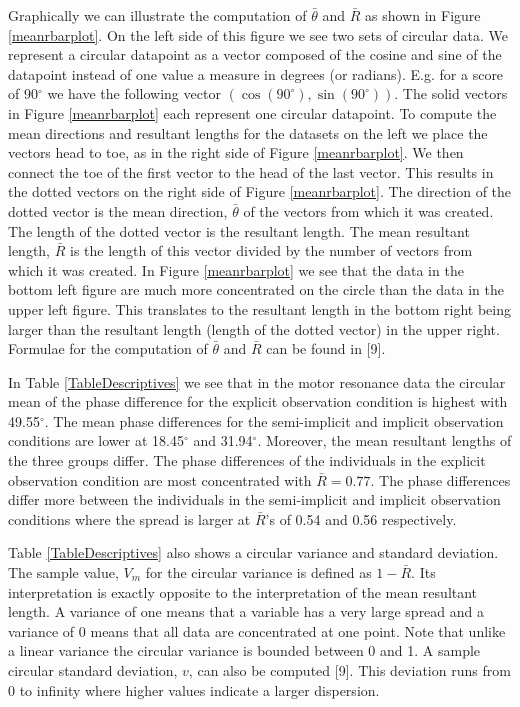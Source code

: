 \documentclass[11pt,]{article}
\begin{document}
Graphically we can illustrate the computation of \(\bar{\theta}\) and
\(\bar{R}\) as shown in Figure \ref{meanrbarplot}. On the left side of
this figure we see two sets of circular data. We represent a circular
datapoint as a vector composed of the cosine and sine of the datapoint
instead of one value a measure in degrees (or radians). E.g. for a score
of 90\(^\circ\) we have the following vector
\((\cos(90^\circ), \sin(90^\circ))\). The solid vectors in Figure
\ref{meanrbarplot} each represent one circular datapoint. To compute the
mean directions and resultant lengths for the datasets on the left we
place the vectors head to toe, as in the right side of Figure
\ref{meanrbarplot}. We then connect the toe of the first vector to the
head of the last vector. This results in the dotted vectors on the right
side of Figure \ref{meanrbarplot}. The direction of the dotted vector is
the mean direction, \(\bar{\theta}\) of the vectors from which it was
created. The length of the dotted vector is the resultant length. The
mean resultant length, \(\bar{R}\) is the length of this vector divided
by the number of vectors from which it was created. In Figure
\ref{meanrbarplot} we see that the data in the bottom left figure are
much more concentrated on the circle than the data in the upper left
figure. This translates to the resultant length in the bottom right
being larger than the resultant length (length of the dotted vector) in
the upper right. Formulae for the computation of \(\bar{\theta}\) and
\(\bar{R}\) can be found in {[}9{]}.

In Table \ref{TableDescriptives} we see that in the motor resonance data
the circular mean of the phase difference for the explicit observation
condition is highest with 49.55\(^{\circ}\). The mean phase differences
for the semi-implicit and implicit observation conditions are lower at
18.45\(^{\circ}\) and 31.94\(^{\circ}\). Moreover, the mean resultant
lengths of the three groups differ. The phase differences of the
individuals in the explicit observation condition are most concentrated
with \(\bar{R} = 0.77\). The phase differences differ more between the
individuals in the semi-implicit and implicit observation conditions
where the spread is larger at \(\bar{R}\)'s of 0.54 and 0.56
respectively.

Table \ref{TableDescriptives} also shows a circular variance and
standard deviation. The sample value, \(V_m\) for the circular variance
is defined as \(1-\bar{R}\). Its interpretation is exactly opposite to
the interpretation of the mean resultant length. A variance of one means
that a variable has a very large spread and a variance of 0 means that
all data are concentrated at one point. Note that unlike a linear
variance the circular variance is bounded between 0 and 1. A sample
circular standard deviation, \(v\), can also be computed {[}9{]}. This
deviation runs from 0 to infinity where higher values indicate a larger
dispersion.
\end{document}
